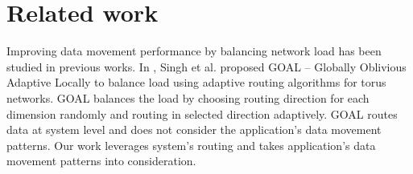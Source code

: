 \section{Related work}
\label{sec:relatedwork}

Improving data movement performance by balancing network load has been studied in previous works. In \cite{singh2003:GOAL}, Singh et al. proposed GOAL -- Globally Oblivious Adaptive Locally to balance load using adaptive routing algorithms for torus networks. GOAL balances the load by choosing routing direction for each dimension randomly and routing in selected direction adaptively. GOAL routes data at system level and does not consider the application's data movement patterns. Our work leverages system's routing and takes application's data movement patterns into consideration.


